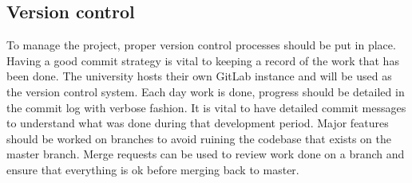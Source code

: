 \subsection{Version control}

To manage the project, proper version control processes should be put in place.
Having a good commit strategy is vital to keeping a record of the work that has been done.
The university hosts their own GitLab instance and will be used as the version control system.
Each day work is done, progress should be detailed in the commit log with verbose fashion.
It is vital to have detailed commit messages to understand what was done during that development period.
Major features should be worked on branches to avoid ruining the codebase that exists on the master branch.
Merge requests can be used to review work done on a branch and ensure that everything is ok before merging back to master.

\clearpage
